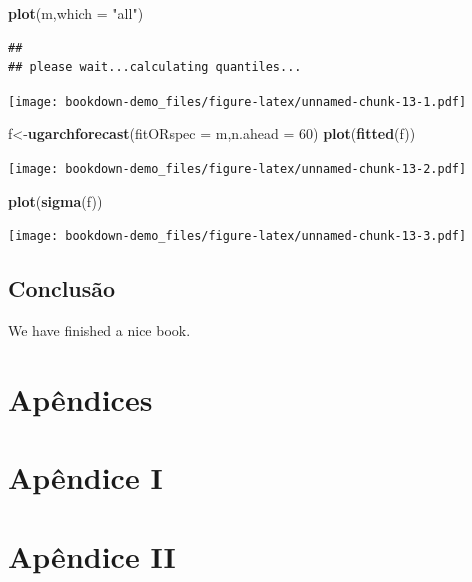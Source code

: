 \documentclass[
  12pt,
  a4paper,
  openany]{book}
\newenvironment{Shaded}{\begin{snugshade}}{\end{snugshade}}
\newcommand{\DataTypeTok}[1]{\textcolor[rgb]{0.13,0.29,0.53}{#1}}
\newcommand{\DecValTok}[1]{\textcolor[rgb]{0.00,0.00,0.81}{#1}}
\newcommand{\KeywordTok}[1]{\textcolor[rgb]{0.13,0.29,0.53}{\textbf{#1}}}
\newcommand{\NormalTok}[1]{#1}
\newcommand{\StringTok}[1]{\textcolor[rgb]{0.31,0.60,0.02}{#1}}
\begin{document}
\begin{Shaded}
\begin{Highlighting}[]
\KeywordTok{plot}\NormalTok{(m,}\DataTypeTok{which =} \StringTok{"all"}\NormalTok{)}
\end{Highlighting}
\end{Shaded}

\begin{verbatim}
## 
## please wait...calculating quantiles...
\end{verbatim}

\texttt{[image: bookdown-demo\_files/figure-latex/unnamed-chunk-13-1.pdf]}

\begin{Shaded}
\begin{Highlighting}[]
\NormalTok{f\textless{}{-}}\KeywordTok{ugarchforecast}\NormalTok{(}\DataTypeTok{fitORspec =}\NormalTok{ m,}\DataTypeTok{n.ahead =} \DecValTok{60}\NormalTok{)}
\KeywordTok{plot}\NormalTok{(}\KeywordTok{fitted}\NormalTok{(f))}
\end{Highlighting}
\end{Shaded}

\texttt{[image: bookdown-demo\_files/figure-latex/unnamed-chunk-13-2.pdf]}

\begin{Shaded}
\begin{Highlighting}[]
\KeywordTok{plot}\NormalTok{(}\KeywordTok{sigma}\NormalTok{(f))}
\end{Highlighting}
\end{Shaded}

\texttt{[image: bookdown-demo\_files/figure-latex/unnamed-chunk-13-3.pdf]}

\hypertarget{conclusuxe3o}{%
\chapter*{Conclusão}\label{conclusuxe3o}}

We have finished a nice book.

  

\part*{Apêndices}

\newpage
\part*{\normalfont\huge\bfseries\centering Apêndice I}
\newpage

\part*{\normalfont\huge\bfseries\centering Apêndice II}
\newpage
\end{document}
